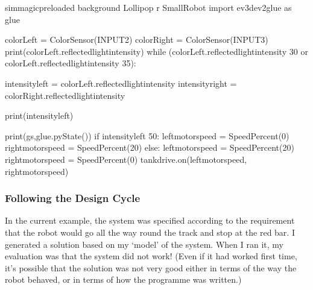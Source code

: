 \documentclass[letterpaper,10pt,english]{sphinxmanual}
\begin{document}

{
\begin{sphinxVerbatim}[commandchars=\\\{\}]
\llap{\color{nbsphinxin}[ ]:\,\hspace{\fboxrule}\hspace{\fboxsep}}\PYGZpc{}\PYGZpc{}sim\PYGZus{}magic\PYGZus{}preloaded \PYGZhy{}\PYGZhy{}background Lollipop \PYGZhy{}r Small\PYGZus{}Robot
import ev3dev2\PYGZus{}glue as glue

colorLeft = ColorSensor(INPUT\PYGZus{}2)
colorRight = ColorSensor(INPUT\PYGZus{}3)
print(colorLeft.reflected\PYGZus{}light\PYGZus{}intensity)
while (colorLeft.reflected\PYGZus{}light\PYGZus{}intensity \PYGZlt{} 30 or colorLeft.reflected\PYGZus{}light\PYGZus{}intensity \PYGZgt{} 35):

    intensity\PYGZus{}left = colorLeft.reflected\PYGZus{}light\PYGZus{}intensity
    \PYGZsh{}intensity\PYGZus{}right = colorRight.reflected\PYGZus{}light\PYGZus{}intensity

    print(intensity\PYGZus{}left)

    print(\PYGZsq{}gs\PYGZsq{},glue.pyState())
    if intensity\PYGZus{}left \PYGZlt{} 50:
        left\PYGZus{}motor\PYGZus{}speed = SpeedPercent(0)
        right\PYGZus{}motor\PYGZus{}speed = SpeedPercent(20)
    else:
        left\PYGZus{}motor\PYGZus{}speed = SpeedPercent(20)
        right\PYGZus{}motor\PYGZus{}speed = SpeedPercent(0)
    tank\PYGZus{}drive.on(left\PYGZus{}motor\PYGZus{}speed, right\PYGZus{}motor\PYGZus{}speed)

\end{sphinxVerbatim}
}


\subsubsection{Following the Design Cycle}
\label{\detokenize{content/04_Robot_Lab/Section_00_04:Following-the-Design-Cycle}}
In the current example, the system was specified according to the requirement that the robot would go all the way round the track and stop at the red bar. I generated a solution based on my ‘model’ of the system. When I ran it, my evaluation was that the system did not work! (Even if it had worked first time, it’s possible that the solution was not very good either in terms of the way the robot behaved, or in terms of how the programme was written.)
\end{document}
